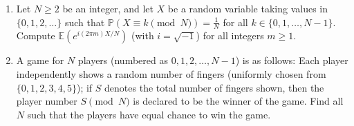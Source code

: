 \begin{exercise}\label{probability:2016:8}
\begin{enumerate}
    \item[(a)] Let $N \geq 2$ be an integer, and let $X$ be a random variable taking values in $\{0, 1, 2, \ldots\}$ such that $\mathbb{P}(X \equiv k \pmod{N}) = \frac{1}{N}$ for all $k \in \{0, 1, \ldots, N-1\}$. Compute $\mathbb{E}(e^{i(2\pi m)X/N})$ (with $i = \sqrt{-1}$) for all integers $m \geq 1$.
    \item[(b)] A game for $N$ players (numbered as $0, 1, 2, \dots, N-1$) is as follows: Each player independently shows a random number of fingers (uniformly chosen from $\{0, 1, 2, 3, 4, 5\}$); if $S$ denotes the total number of fingers shown, then the player number $S \pmod{N}$ is declared to be the winner of the game.
    Find all $N$ such that the players have equal chance to win the game.
\end{enumerate}
\end{exercise}

